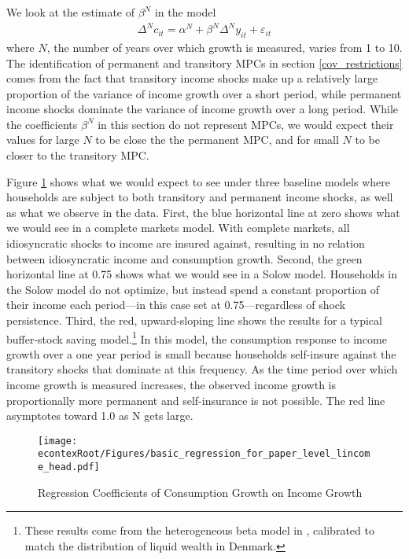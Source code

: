 \documentclass[titlepage]{\econtex}\newcommand{\texname}{ConsumptionHeterogeneity}
\begin{document}
	We look at the estimate of $\beta^N$ in the model
	\begin{align*}
	\Delta^N c_{it} = \alpha^N + \beta^N \Delta^N y_{it} + \varepsilon_{it}
	\end{align*}
	where $N$, the number of years over which growth is measured, varies from 1 to 10. The identification of permanent and transitory MPCs in section \ref{cov_restrictions} comes from the fact that transitory income shocks make up a relatively large proportion of the variance of income growth over a short period, while permanent income shocks dominate the variance of income growth over a long period. While the coefficients $\beta^N$ in this section do not represent MPCs, we would expect their values for large $N$ to be close the the permanent MPC, and for small $N$ to be closer to the transitory MPC. 
	
	Figure \ref{fig:GrowthReg} shows what we would expect to see under three baseline models where households are subject to both transitory and permanent income shocks, as well as what we observe in the data. First, the blue horizontal line at zero shows what we would see in a complete markets model. With complete markets, all idiosyncratic shocks to income are insured against, resulting in no relation between idiosyncratic income and consumption growth. Second, the green horizontal line at 0.75 shows what we would see in a Solow model. Households in the Solow model do not optimize, but instead spend a constant proportion of their income each period---in this case set at 0.75---regardless of shock persistence. Third, the red, upward-sloping line shows the results for a typical buffer-stock saving model.\footnote{These results come from the heterogeneous beta model in \cite{carroll_distribution_2017}, calibrated to match the distribution of liquid wealth in Denmark.} In this model, the consumption response to income growth over a one year period is small because households self-insure against the transitory shocks that dominate at this frequency. As the time period over which income growth is measured increases, the observed income growth is proportionally more permanent and self-insurance is not possible. The red line asymptotes toward 1.0 as N gets large.
	\begin{figure} 
		\begin{centering}
			\texttt{[image: \\econtexRoot/Figures/basic\_regression\_for\_paper\_level\_lincome\_head.pdf]}
			\caption{Regression Coefficients of Consumption Growth on Income Growth}
			\label{fig:GrowthReg}
		\end{centering}
	\end{figure}
	
\end{document}
